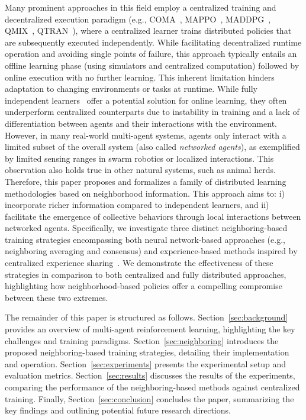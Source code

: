 \documentclass[sigconf]{acmart}
\begin{document}
\sloppy
Many prominent approaches in this field employ a centralized training and decentralized execution paradigm
 (e.g., COMA~\cite{foerster2018counterfactual}, MAPPO~\cite{yu2022surprising}, MADDPG~\cite{DBLP:conf/nips/LoweWTHAM17}, QMIX~\cite{DBLP:conf/icml/RashidSWFFW18}, QTRAN~\cite{DBLP:conf/icml/SonKKHY19}), 
 where a centralized learner trains distributed policies that are subsequently executed independently. 
 While facilitating decentralized runtime operation and avoiding single points of failure, 
 this approach typically entails an offline learning phase (using simulators and centralized computation) 
 followed by online execution with no further learning. 
 This inherent limitation hinders adaptation to changing environments or tasks at runtime.  
% 
While fully independent learners~\cite{abed2016comparison} offer a potential solution for online learning,
 they often underperform centralized counterparts due to instability in training and a lack of differentiation between agents and their interactions with the environment. 
%
However, in many real-world multi-agent systems, 
 agents only interact with a limited subset of the overall system (also called \emph{networked agents}),
 as exemplified by limited sensing ranges in swarm robotics or localized interactions.  
 This observation also holds true in other natural systems, such as animal herds.
%
Therefore, 
this paper proposes and formalizes a family of distributed learning methodologies based on neighborhood information.
This approach aims to: 
i) incorporate richer information compared to independent learners, and
ii) facilitate the emergence of collective behaviors through local interactions between networked agents.
Specifically, we investigate three distinct neighboring-based training strategies encompassing both neural network-based approaches 
(e.g., neighboring averaging and consensus) 
and experience-based methods inspired by centralized experience sharing~\cite{DBLP:conf/nips/ChristianosSA20}. 
We demonstrate the effectiveness of these strategies in comparison to both centralized and fully distributed approaches, 
highlighting how neighborhood-based policies offer a compelling compromise between these two extremes.

The remainder of this paper is structured as follows.
Section~\ref{sec:background} provides an overview of multi-agent reinforcement learning,
highlighting the key challenges and training paradigms.
Section~\ref{sec:neighboring} introduces the proposed neighboring-based training strategies,
detailing their implementation and operation.
Section~\ref{sec:experiments} presents the experimental setup and evaluation metrics.
Section~\ref{sec:results} discusses the results of the experiments,
comparing the performance of the neighboring-based methods against centralized training.
Finally, Section~\ref{sec:conclusion} concludes the paper,
summarizing the key findings and outlining potential future research directions.
\end{document}
